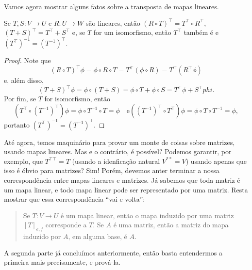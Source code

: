 Vamos agora mostrar alguns fatos sobre a transposta de mapas lineares.

\begin{proposition}
    Se $T,S \colon V \to U$ e $R \colon U \to W$ são lineares, então $(R \circ T)^\top = T^\top \circ R^\top$, $(T + S)^\top = T^\top + S^\top$ e, se $T$ for um isomorfismo, então $T^\top$ também é e $(T^\top)^{-1} = (T^{-1})^\top$.
\end{proposition}
\begin{proof}
    Note que \begin{equation}
        (R \circ T)^\top\phi = \phi \circ R \circ T = T^\top(\phi \circ R) = T^\top(R^\top \phi)
    \end{equation} e, além disso, \begin{equation}
        (T + S)^\top\phi = \phi \circ (T + S) = \phi \circ T + \phi \circ S = T^\top \phi + S^\top phi.
    \end{equation} Por fim, se $T$ for isomorfismo, então \begin{equation}
        (T^\top \circ (T^{-1})^\top)\phi = \phi \circ T^{-1} \circ T = \phi \quad \text{e} ((T^{-1})^\top \circ T^\top)\phi = \phi \circ T \circ T^{-1} = \phi,
    \end{equation} portanto $(T^\top)^{-1} = (T^{-1})^\top$.
\end{proof}

Até agora, temos maquinário para provar um monte de coisas sobre matrizes, usando mapas lineares. Mas e o contrário, é possível? Podemos garantir, por exemplo, que $T^{\top\top} = T$ (usando a idenficação natural $V^{**} = V$) usando apenas que isso é óbvio para matrizes? Sim! Porém, devemos anter terminar a nossa correspondência entre mapas lineares e matrizes. Já sabemos que toda matriz é um mapa linear, e todo mapa linear pode ser representado por uma matriz. Resta mostrar que essa correspondência ``vai e volta'': \begin{quotation}
    Se $T \colon V \to U$ é um mapa linear, então o mapa induzido por uma matriz $[T]_{e,f}$ corresponde a $T$. Se $A$ é uma matriz, então a matriz do mapa induzido por $A$, em alguma base, é $A$.
\end{quotation}
A segunda parte já concluímos anteriormente, então basta entendermos a primeira mais precisamente, e prová-la.

